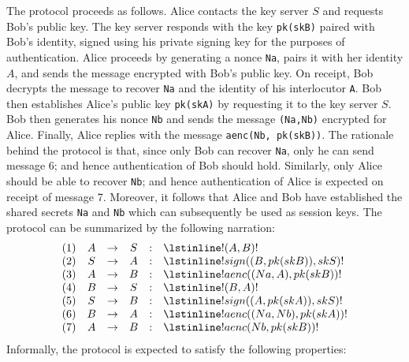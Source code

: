 \documentclass{book}
\newcommand{\tblue}[1]{\textcolor{blue}{REMARK: \emph{#1}}}
\renewcommand{\marginpar}[1]{\tblue{#1}}
\newcommand{\A}{A}
\newcommand{\B}{B}
\newcommand{\T}{S}
\begin{document}
The protocol proceeds as follows. Alice contacts the key server $\T$ and requests Bob's public key. The key server responds with the key \lstinline!pk(skB)! paired with Bob's identity, signed using his private signing key for the purposes of authentication. Alice proceeds by generating a nonce \lstinline!Na!, pairs it with her identity $\A$, and sends the message encrypted with Bob's public key. On receipt, Bob decrypts the message to recover \lstinline!Na! and the identity of his interlocutor \lstinline!A!. Bob then establishes Alice's public key \lstinline!pk(skA)! by requesting it to the key server $\T$. Bob then generates his nonce \lstinline!Nb! and sends the message \lstinline!(Na,Nb)! encrypted for Alice. Finally, Alice replies with the message \lstinline!aenc(Nb, pk(skB))!. The rationale behind the protocol is that, since only Bob can recover \lstinline!Na!, only he can send message 6; and hence authentication of Bob should hold. Similarly, only Alice should be able to recover \lstinline!Nb!; and hence authentication of Alice is expected on receipt of message 7. Moreover, it follows that Alice and Bob have established the shared secrets \lstinline!Na! and \lstinline!Nb! which can subsequently be used as session keys. The protocol can be summarized by the following narration:
\[
\begin{array}{cccccl}
(1) & \A &\rightarrow& \T &:& \lstinline!(A, B) !\\
(2) & \T &\rightarrow& \A &:& \lstinline!sign((B, pk(skB)), skS) !\\
(3) & \A &\rightarrow& \B &:& \lstinline!aenc((Na, A), pk(skB)) !\\
(4) & \B &\rightarrow& \T &:& \lstinline!(B, A) !\\
(5) & \T &\rightarrow& \B &:& \lstinline!sign((A, pk(skA)), skS) !\\
(6) & \B &\rightarrow& \A &:& \lstinline!aenc((Na, Nb), pk(skA)) !\\
(7) & \A &\rightarrow& \B &:& \lstinline!aenc(Nb, pk(skB))!
\end{array}
\]
Informally, the protocol is expected to satisfy the following properties:
%
\end{document}
